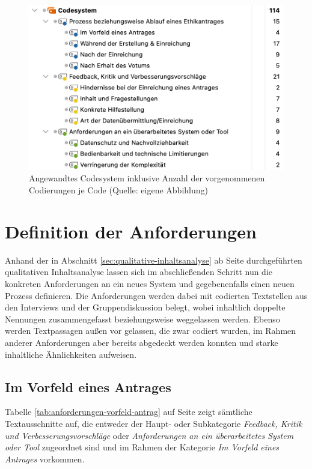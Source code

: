\documentclass[a4paper,12pt,twoside]{scrreprt}
\begin{document}
\begin{figure}[ht]
    \centering
    \includegraphics[width=.8\linewidth]{thesis/images/Luidold_Codesystem-Anzahl.png}
    \caption[Angewandtes Codesystem inklusive Anzahl der vorgenommenen Codierungen je Code]{Angewandtes Codesystem inklusive Anzahl der vorgenommenen Codierungen je Code (Quelle: eigene Abbildung)}
    \label{fig:codesystem-anzahl}
\end{figure}

\section{Definition der Anforderungen}
\label{sec:definition-anforderungen}

Anhand der in Abschnitt \ref{sec:qualitative-inhaltsanalyse} ab Seite \pageref{sec:qualitative-inhaltsanalyse} durchgeführten qualitativen Inhaltsanalyse lassen sich im abschließenden Schritt nun die konkreten Anforderungen an ein neues System und gegebenenfalls einen neuen Prozess definieren. Die Anforderungen werden dabei mit codierten Textstellen aus den Interviews und der Gruppendiskussion belegt, wobei inhaltlich doppelte Nennungen zusammengefasst beziehungsweise weggelassen werden. Ebenso werden Textpassagen außen vor gelassen, die zwar codiert wurden, im Rahmen anderer Anforderungen aber bereits abgedeckt werden konnten und starke inhaltliche Ähnlichkeiten aufweisen.

\subsection{Im Vorfeld eines Antrages}
\label{sub-sec:vorfeld-antrag}

Tabelle \ref{tab:anforderungen-vorfeld-antrag} auf Seite \pageref{tab:anforderungen-vorfeld-antrag} zeigt sämtliche Textausschnitte auf, die entweder der Haupt- oder Subkategorie \textit{Feedback, Kritik und Verbesserungsvorschläge} oder \textit{Anforderungen an ein überarbeitetes System oder Tool} zugeordnet sind und im Rahmen der Kategorie \textit{Im Vorfeld eines Antrages} vorkommen.
\end{document}
